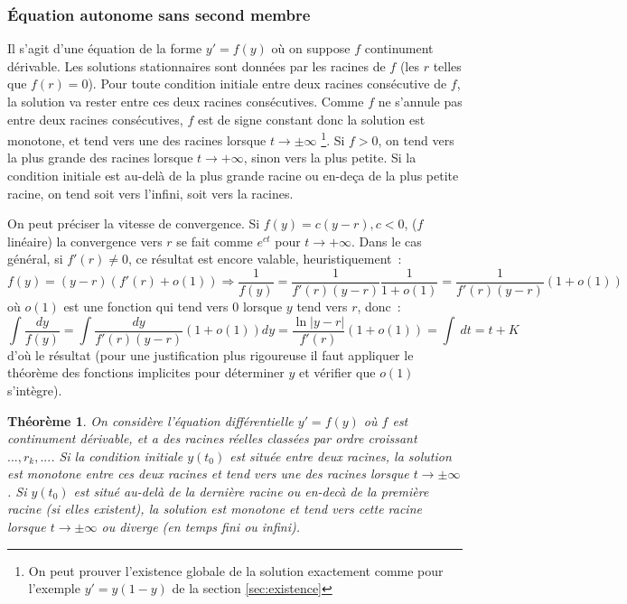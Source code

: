 \documentclass[a4paper,11pt]{article}
\newtheorem{thm}{Théorème}
\begin{document}
\begin{giacjshere}
\subsubsection{\'Equation autonome sans second membre}
Il s'agit d'une \'equation de la forme $y'=f(y)$ o\`u on
suppose $f$ continument d\'erivable. Les solutions
stationnaires sont donn\'ees par les racines de $f$ (les
$r$ telles que $f(r)=0$). Pour toute condition initiale entre
deux racines cons\'ecutive de $f$, la solution va rester entre
ces deux racines cons\'ecutives. Comme $f$ ne s'annule pas
entre deux racines cons\'ecutives, $f$ est de signe constant
donc la solution est monotone,
et tend vers une des racines lorsque $t \rightarrow \pm \infty$
\footnote{On peut prouver l'existence globale de la solution
exactement comme pour l'exemple $y'=y(1-y)$ de la section 
\ref{sec:existence}}.
Si $f>0$, on tend vers la plus grande des racines lorsque $t
\rightarrow +\infty$, sinon vers la plus petite. Si la condition 
initiale est au-del\`a de la plus grande racine ou en-de\c{c}a
de la plus petite racine, on tend soit vers l'infini, soit vers la racines.

On peut pr\'eciser
la vitesse de convergence. Si $f(y)=c(y-r), c<0$, ($f$ lin\'eaire)
la convergence vers $r$ se fait comme $e^{ct}$ pour $t \rightarrow
+\infty$. Dans le cas
g\'en\'eral, si $f'(r) \neq 0$, 
ce r\'esultat est encore valable, heuristiquement~:
$$ f(y)=(y-r)(f'(r)+o(1)) \Rightarrow \frac{1}{f(y)}=
\frac{1}{f'(r)(y-r)} \frac{1}{1+o(1)}
=\frac{1}{f'(r)(y-r)}(1 + o(1))$$
o\`u $o(1)$ est une fonction qui tend vers 0 lorsque $y$ tend vers
$r$, donc~:
$$ \int \frac{dy}{f(y)} = \int \frac{dy}{f'(r)(y-r)}(1 + o(1)) dy 
= \frac{\ln|y-r|}{f'(r)} (1 + o(1)) = \int \ dt = t+K  $$
d'o\`u le r\'esultat (pour une justification plus rigoureuse
il faut appliquer le th\'eor\`eme des fonctions implicites
pour d\'eterminer $y$ et v\'erifier que $o(1)$ s'int\`egre).

\begin{thm}
On consid\`ere l'\'equation diff\'erentielle $y'=f(y)$ o\`u
$f$ est continument d\'erivable, et a des racines r\'eelles
class\'ees par ordre croissant $...,r_k,...$. Si la condition
initiale $y(t_0)$ est
situ\'ee entre deux racines, la solution est monotone entre
ces deux racines et tend vers une des racines lorsque $t\rightarrow
\pm \infty$. Si $y(t_0)$ est situ\'e au-del\`a de la derni\`ere racine
ou en-dec\`a de la premi\`ere racine (si elles existent), 
la solution est monotone et
tend vers cette racine lorsque $t\rightarrow \pm \infty$
ou diverge (en temps fini ou infini).


\end{thm}
\end{giacjshere}
\end{document}
